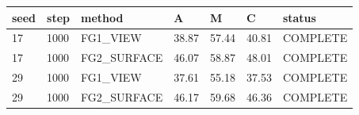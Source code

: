 \begin{tabular}{lllllll}
\toprule
seed & step & method & A & M & C & status \\
\midrule
17 & 1000 & FG1\_VIEW & 38.87 & 57.44 & 40.81 & COMPLETE \\
17 & 1000 & FG2\_SURFACE & 46.07 & 58.87 & 48.01 & COMPLETE \\
29 & 1000 & FG1\_VIEW & 37.61 & 55.18 & 37.53 & COMPLETE \\
29 & 1000 & FG2\_SURFACE & 46.17 & 59.68 & 46.36 & COMPLETE \\
\bottomrule
\end{tabular}
